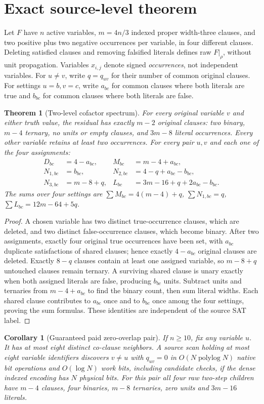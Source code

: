 \documentclass[11pt]{article}
\newtheorem{theorem}{Theorem}
\newtheorem{corollary}{Corollary}
\begin{document}
\section{Exact source-level theorem}
Let $F$ have $n$ active variables, $m=4n/3$ indexed proper width-three clauses, and two positive plus two negative occurrences per variable, in four different clauses. Deleting satisfied clauses and removing falsified literals defines raw $F|_\rho$, without unit propagation. Variables $x_{i,j}$ denote signed \emph{occurrences}, not independent variables. For $u\ne v$, write $q=q_{uv}$ for their number of common original clauses. For settings $u=b,v=c$, write $a_{bc}$ for common clauses where both literals are true and $b_{bc}$ for common clauses where both literals are false.
\begin{theorem}[Two-level cofactor spectrum]
For every original variable $v$ and either truth value, the residual has exactly $m-2$ original clauses: two binary, $m-4$ ternary, no units or empty clauses, and $3m-8$ literal occurrences. Every other variable retains at least two occurrences.
For every pair $u,v$ and each one of the four assignments:
\[
\begin{aligned}
D_{bc}&=4-a_{bc},&
M_{bc}&=m-4+a_{bc},\\
N_{1,bc}&=b_{bc},&
N_{2,bc}&=4-q+a_{bc}-b_{bc},\\
N_{3,bc}&=m-8+q,&
L_{bc}&=3m-16+q+2a_{bc}-b_{bc}.
\end{aligned}
\]
The sums over four settings are
$\sum M_{bc}=4(m-4)+q$,
$\sum N_{1,bc}=q$,
$\sum L_{bc}=12m-64+5q$.
\end{theorem}
\begin{proof}
A chosen variable has two distinct true-occurrence clauses, which are deleted, and two distinct false-occurrence clauses, which become binary. After two assignments, exactly four original true occurrences have been set, with $a_{bc}$ duplicate satisfactions of shared clauses; hence exactly $4-a_{bc}$ original clauses are deleted. Exactly $8-q$ clauses contain at least one assigned variable, so $m-8+q$ untouched clauses remain ternary. A surviving shared clause is unary exactly when both assigned literals are false, producing $b_{bc}$ units. Subtract units and ternaries from $m-4+a_{bc}$ to find the binary count, then sum literal widths. Each shared clause contributes to $a_{bc}$ once and to $b_{bc}$ once among the four settings, proving the sum formulas. These identities are independent of the source SAT label.
\end{proof}
\begin{corollary}[Guaranteed paid zero-overlap pair]
If $n\ge10$, fix any variable $u$. It has at most eight distinct co-clause neighbors. A source scan holding at most eight variable identifiers discovers $v\ne u$ with $q_{uv}=0$ in $O(N\operatorname{polylog}N)$ native bit operations and $O(\log N)$ work bits, including candidate checks, if the dense indexed encoding has $N$ physical bits. For this pair all four raw two-step children have $m-4$ clauses, four binaries, $m-8$ ternaries, zero units and $3m-16$ literals.
\end{corollary}
\end{document}
